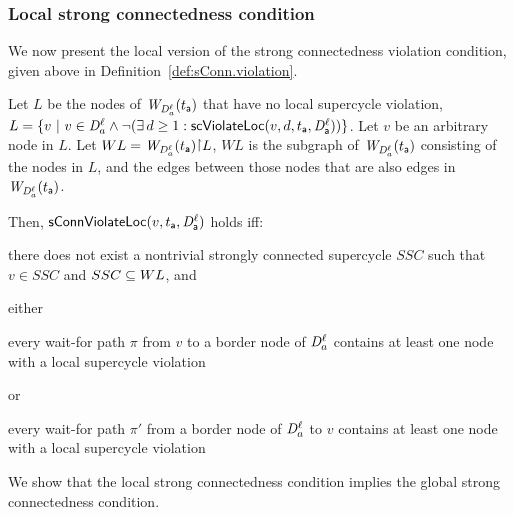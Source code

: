 \subsubsection{Local strong connectedness condition}

We now present the local version of the strong connectedness violation condition, given above in Definition~\ref{def:sConn.violation}.


\label{def:sConn.violation.loc}

Let $L$ be the nodes of $\mathit{W}_{\mathit{D}_{a}^{\ell}}({t_{\mathsf{a}}})$ that have no local
supercycle violation, \ie $L = \{ v ~|~ v \in \mathit{D}_{a}^{\ell} \land \neg (\exists\, d \ge 1: \mathsf{scViolateLoc}(v,d,t_{\mathsf{a}},\mathit{D}_{\mathsf{a}}^{\ell}))  \}$.
Let $v$ be an arbitrary node in $L$. 
Let $WL = \wfg{\dsk{a}{\l}}{t_\act} \pj L$, \ie $WL$ is the subgraph of $\mathit{W}_{\mathit{D}_{a}^{\ell}}({t_{\mathsf{a}}})$ consisting of the
nodes in $L$, and the edges between those nodes that are also edges in $\mathit{W}_{\mathit{D}_{a}^{\ell}}({t_{\mathsf{a}}})$.

Then, $\mathsf{sConnViolateLoc}(v,t_{\mathsf{a}},\mathit{D}_{\mathsf{a}}^{\ell})$ holds iff:
\bn

\item \label{def:sConn.violation.loc:scc}
there does not exist a nontrivial strongly connected supercycle $SSC$ such that $v \in SSC$ and $SSC \subseteq WL$, and


\item \label{def:sConn.violation.border}
either
    \bn

    \item \label{def:sConn.violation.loc:wait-for-out} every wait-for path $\pi$ from $v$ to a border node
      of $\mathit{D}_{a}^{\ell}$ contains at least one node with a local supercycle violation

     or

    \item \label{def:sConn.violation.loc:wait-for-in} every wait-for path $\pi'$ from a border node
      of $\mathit{D}_{a}^{\ell}$ to $v$ contains at least one node with a local supercycle violation

    \en

\en
\ed


We show that the local strong connectedness condition implies the global strong connectedness condition.

